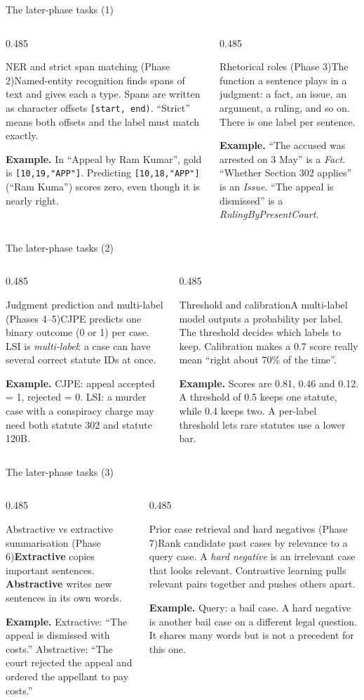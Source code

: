 \documentclass[aspectratio=169,11pt]{beamer}
\newcommand{\code}[1]{\texttt{\small #1}}
\newcommand{\term}[3]{%
  \begin{block}{#1}\small #2\par\vspace{1mm}%
  {\color{exgreen}\textbf{Example.}} #3\end{block}}
\newcommand{\twoterms}[6]{%
  \begin{columns}[T]
    \begin{column}{0.485\textwidth}\term{#1}{#2}{#3}\end{column}
    \begin{column}{0.485\textwidth}\term{#4}{#5}{#6}\end{column}
  \end{columns}}
\begin{document}
\begin{frame}{The later-phase tasks (1)}
  \twoterms{NER and strict span matching (Phase 2)}
  {Named-entity recognition finds spans of text and gives each a type. Spans are written as character offsets \code{[start, end)}. ``Strict'' means both offsets and the label must match exactly.}
  {In ``Appeal by Ram Kumar'', gold is \code{[10,19,"APP"]}. Predicting \code{[10,18,"APP"]} (``Ram Kuma'') scores zero, even though it is nearly right.}
  {Rhetorical roles (Phase 3)}
  {The function a sentence plays in a judgment: a fact, an issue, an argument, a ruling, and so on. There is one label per sentence.}
  {``The accused was arrested on 3 May'' is a \emph{Fact}. ``Whether Section 302 applies'' is an \emph{Issue}. ``The appeal is dismissed'' is a \emph{RulingByPresentCourt}.}
\end{frame}

\begin{frame}{The later-phase tasks (2)}
  \twoterms{Judgment prediction and multi-label (Phases 4--5)}
  {CJPE predicts one binary outcome (0 or 1) per case. LSI is \emph{multi-label}: a case can have several correct statute IDs at once.}
  {CJPE: appeal accepted = 1, rejected = 0. LSI: a murder case with a conspiracy charge may need both statute 302 and statute 120B.}
  {Threshold and calibration}
  {A multi-label model outputs a probability per label. The threshold decides which labels to keep. Calibration makes a 0.7 score really mean ``right about 70\% of the time''.}
  {Scores are 0.81, 0.46 and 0.12. A threshold of 0.5 keeps one statute, while 0.4 keeps two. A per-label threshold lets rare statutes use a lower bar.}
\end{frame}

\begin{frame}{The later-phase tasks (3)}
  \twoterms{Abstractive vs extractive summarisation (Phase 6)}
  {\textbf{Extractive} copies important sentences. \textbf{Abstractive} writes new sentences in its own words.}
  {Extractive: ``The appeal is dismissed with costs.'' Abstractive: ``The court rejected the appeal and ordered the appellant to pay costs.''}
  {Prior case retrieval and hard negatives (Phase 7)}
  {Rank candidate past cases by relevance to a query case. A \emph{hard negative} is an irrelevant case that looks relevant. Contrastive learning pulls relevant pairs together and pushes others apart.}
  {Query: a bail case. A hard negative is another bail case on a different legal question. It shares many words but is not a precedent for this one.}
\end{frame}
\end{document}
